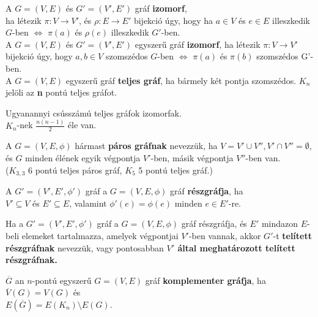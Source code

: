 \begin{frame}

\begin{tcolorbox}[title={Def.: Gráfok izomorfiája}]
A $G = (V, E)$ és $G' = (V', E')$ gráf \textbf{izomorf},\\
ha létezik ${\pi} : V \rightarrow V'$, és $\rho : E \rightarrow E'$ bijekció úgy, hogy ha $a \in V$ és $e \in E$ illeszkedik $G$-ben $\iff$ ${\pi}(a)$ és ${\rho}(e)$ illeszkedik $G'$-ben.\\
\mbigskip
A $G = (V, E)$ és $G' = (V', E')$ egyszerű gráf \textbf{izomorf}, ha létezik ${\pi} : V \rightarrow V'$ bijekció úgy, hogy $a, b \in V$ szomszédos $G$-ben $\iff$ ${\pi}(a)$ és ${\pi}(b)$ szomszédos G'-ben.\\
\mbigskip
A $G = (V, E)$ egyszerű gráf \textbf{teljes gráf}, ha bármely két pontja szomszédos. \textbf{$K_n$} jelöli az \textbf{n} pontú teljes gráfot.
\end{tcolorbox}

\begin{tcolorbox}[title={Ész}]
Ugyanannyi csússzámú teljes gráfok izomorfak.\\
\mbigskip
$K_n$-nek $\frac{n(n - 1)}{2}$ éle van.
\end{tcolorbox}
\end{frame}

\begin{frame}

\begin{tcolorbox}[title={Def.: Páros Gráf}]
A $G = (V, E, {\phi})$ hármast \textbf{páros gráfnak} nevezzük, ha $V = V' \cup V'', V' \cap V'' = \emptyset$, és $G$ minden élének egyik végpontja $V'$-ben, másik végpontja $V''$-ben van.\\
\mmedskip
($K_{3, 3}$ 6 pontú teljes páros gráf, $K_5$ 5 pontú teljes gráf.)
\end{tcolorbox}
\begin{tcolorbox}[title={Def.: Részgráf}]
A $G' = (V', E', {\phi}')$ gráf a $G = (V, E, {\phi})$ gráf \textbf{részgráfja}, ha\\
$V' \subseteq V$ és $E' \subseteq E$, valamint ${\phi}'(e) = {\phi}(e)$ minden $e \in E'$-re.
\end{tcolorbox}
\begin{tcolorbox}[title={Def.: Telített Részgráf}]
Ha a $G' = (V', E', {\phi}')$ gráf a $G = (V, E, {\phi})$ gráf részgráfja, és $E'$ mindazon $E$-beli elemeket tartalmazza, amelyek végpontjai $V'$-ben vannak, akkor $G'$-t \textbf{telített részgráfnak} nevezzük, vagy pontosabban \textbf{$V'$ által meghatározott telített részgráfnak.}
\end{tcolorbox}
\begin{tcolorbox}[title={Komplementer Gráf}]
$\overline{G}$ an $n$-pontú egyszerű $G = (V, E)$ gráf \textbf{komplementer gráfja}, ha\\
\msmallskip
$\overline{V}(G) = V(G)$ és\\
$E(\overline{G}) = E(K_n) \setminus E(G)$.
\end{tcolorbox}

\end{frame}

